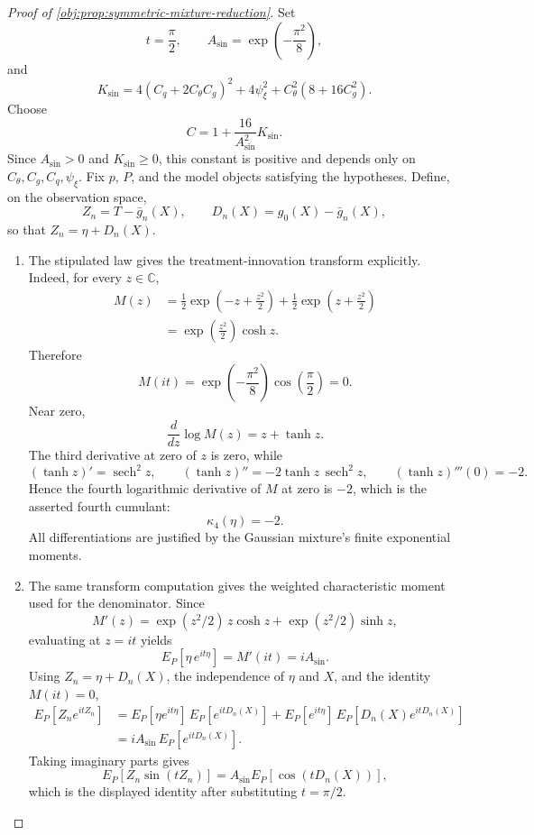 \documentclass[11pt]{article}
\begin{document}
\begin{proof}[Proof of \cref{obj:prop:symmetric-mixture-reduction}]
Set
\[
t=\frac{\pi}{2},\qquad
A_{\sin}=\exp\!\left(-\frac{\pi^2}{8}\right),
\]
and
\[
K_{\sin}
=
4(C_q+2C_{\theta}C_g)^2+4\psi_{\xi}^2
+C_{\theta}^2(8+16C_g^2).
\]
Choose
\[
C=1+\frac{16}{A_{\sin}^2}K_{\sin}.
\]
Since \(A_{\sin}>0\) and \(K_{\sin}\ge0\), this constant is positive and depends only on
\(C_{\theta},C_g,C_q,\psi_{\xi}\). Fix \(p\), \(P\), and the model objects satisfying the
hypotheses. Define, on the observation space,
\[
Z_n=T-\bar g_n(X),\qquad
D_n(X)=g_0(X)-\bar g_n(X),
\]
so that \(Z_n=\eta+D_n(X)\). %

\begin{enumerate}
\item The stipulated law gives the treatment-innovation transform explicitly. Indeed, for
every \(z\in\mathbb C\),
\[
\begin{aligned}
M(z)
&=\frac12\exp\!\left(-z+\frac{z^2}{2}\right)
  +\frac12\exp\!\left(z+\frac{z^2}{2}\right)  \\
&=\exp\!\left(\frac{z^2}{2}\right)\cosh z .
\end{aligned}
\]
Therefore
\[
M(it)=\exp\!\left(-\frac{\pi^2}{8}\right)\cos\!\left(\frac{\pi}{2}\right)=0.
\]
Near zero,
\[
\frac{d}{dz}\log M(z)=z+\tanh z.
\]
The third derivative at zero of \(z\) is zero, while
\[
(\tanh z)'=\operatorname{sech}^2 z,\qquad
(\tanh z)''=-2\tanh z\,\operatorname{sech}^2 z,
\qquad
(\tanh z)'''(0)=-2.
\]
Hence the fourth logarithmic derivative of \(M\) at zero is \(-2\), which is the asserted
fourth cumulant:
\[
\kappa_4(\eta)=-2 .
\]
All differentiations are justified by the Gaussian mixture's finite exponential moments. %

\item The same transform computation gives the weighted characteristic moment used for the
denominator. Since
\[
M'(z)=\exp(z^2/2)\,z\cosh z+\exp(z^2/2)\sinh z,
\]
evaluating at \(z=it\) yields
\[
E_P\!\left[\eta\,e^{it\eta}\right]
=M'(it)
=iA_{\sin}.
\]
Using \(Z_n=\eta+D_n(X)\), the independence of \(\eta\) and \(X\), and the identity
\(M(it)=0\),
\[
\begin{aligned}
E_P[Z_ne^{itZ_n}]
&=E_P[\eta e^{it\eta}]\,E_P[e^{itD_n(X)}]
  +E_P[e^{it\eta}]\,E_P[D_n(X)e^{itD_n(X)}] \\
&=iA_{\sin}\,E_P[e^{itD_n(X)}].
\end{aligned}
\]
Taking imaginary parts gives
\[
E_P\!\left[Z_n\sin(tZ_n)\right]
=
A_{\sin}E_P\!\left[\cos(tD_n(X))\right],
\]
which is the displayed identity after substituting \(t=\pi/2\). %


\end{enumerate}
\end{proof}
\end{document}
